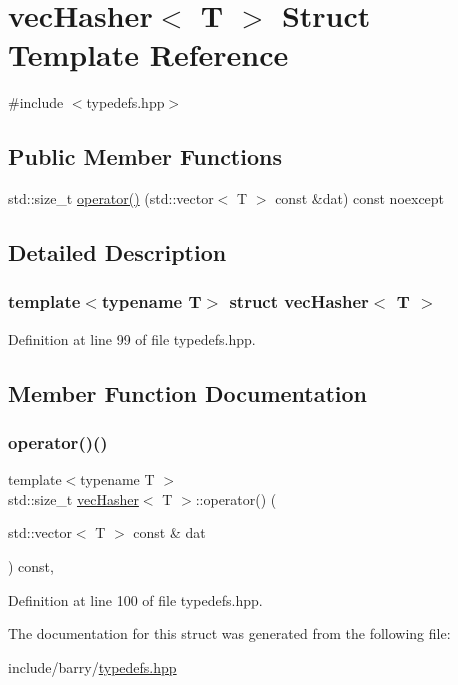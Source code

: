 \hypertarget{structvec_hasher}{}\section{vec\+Hasher$<$ T $>$ Struct Template Reference}
\label{structvec_hasher}


{\ttfamily \#include $<$typedefs.\+hpp$>$}

\subsection*{Public Member Functions}
\begin{DoxyCompactItemize}
\item 
std\+::size\+\_\+t \hyperlink{structvec_hasher_ae8127d9b7d302fe59bd64e7067e7ba61}{operator()} (std\+::vector$<$ T $>$ const \&dat) const noexcept
\end{DoxyCompactItemize}


\subsection{Detailed Description}
\subsubsection*{template$<$typename T$>$\newline
struct vec\+Hasher$<$ T $>$}



Definition at line 99 of file typedefs.\+hpp.



\subsection{Member Function Documentation}
\mbox{\label{structvec_hasher_ae8127d9b7d302fe59bd64e7067e7ba61}} 
\subsubsection{\texorpdfstring{operator()()}{operator()()}}
{\footnotesize\ttfamily template$<$typename T $>$ \\
std\+::size\+\_\+t \hyperlink{structvec_hasher}{vec\+Hasher}$<$ T $>$\+::operator() (\begin{DoxyParamCaption}\item[{std\+::vector$<$ T $>$ const \&}]{dat }\end{DoxyParamCaption}) const\hspace{0.3cm}{\ttfamily [inline]}, {\ttfamily [noexcept]}}



Definition at line 100 of file typedefs.\+hpp.



The documentation for this struct was generated from the following file\+:\begin{DoxyCompactItemize}
\item 
include/barry/\hyperlink{typedefs_8hpp}{typedefs.\+hpp}\end{DoxyCompactItemize}
